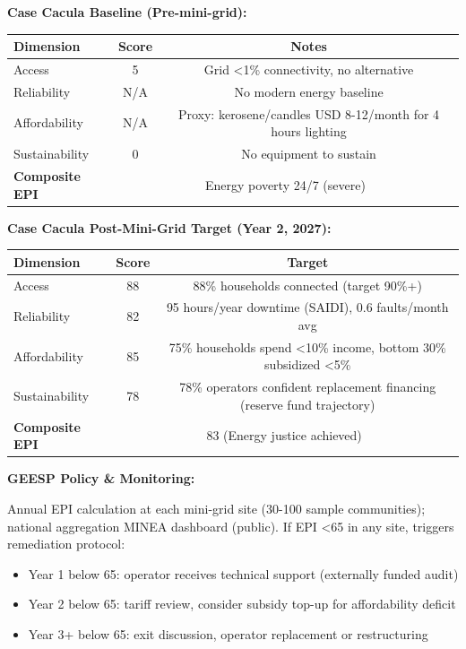 \documentclass[12pt, a4paper]{article}
\begin{document}
\textbf{Case Cacula Baseline (Pre-mini-grid):}

\begin{center}
\begin{tabular}{|l|c|c|}
\hline
\textbf{Dimension} & \textbf{Score} & \textbf{Notes} \\
\hline
Access & 5 & Grid <1\% connectivity, no alternative \\
Reliability & N/A & No modern energy baseline \\
Affordability & N/A & Proxy: kerosene/candles USD 8-12/month for 4 hours lighting \\
Sustainability & 0 & No equipment to sustain \\
\hline
\textbf{Composite EPI} & \multicolumn{2}{|c|}{Energy poverty 24/7 (severe)} \\
\hline
\end{tabular}
\end{center}

\textbf{Case Cacula Post-Mini-Grid Target (Year 2, 2027):}

\begin{center}
\begin{tabular}{|l|c|c|}
\hline
\textbf{Dimension} & \textbf{Score} & \textbf{Target} \\
\hline
Access & 88 & 88\% households connected (target 90\%+) \\
Reliability & 82 & 95 hours/year downtime (SAIDI), 0.6 faults/month avg \\
Affordability & 85 & 75\% households spend <10\% income, bottom 30\% subsidized <5\% \\
Sustainability & 78 & 78\% operators confident replacement financing (reserve fund trajectory) \\
\hline
\textbf{Composite EPI} & \multicolumn{2}{|c|}{83 (Energy justice achieved)} \\
\hline
\end{tabular}
\end{center}

\textbf{GEESP Policy \& Monitoring:}

Annual EPI calculation at each mini-grid site (30-100 sample communities); national aggregation MINEA dashboard (public). If EPI <65 in any site, triggers remediation protocol:

\begin{itemize}
\item Year 1 below 65: operator receives technical support (externally funded audit)
\item Year 2 below 65: tariff review, consider subsidy top-up for affordability deficit
\item Year 3+ below 65: exit discussion, operator replacement or restructuring
\end{itemize}
\end{document}

